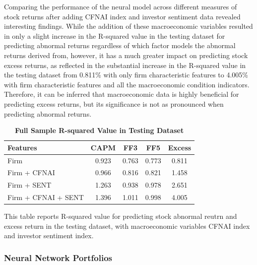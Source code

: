 Comparing the performance of the neural model across different measures of stock returns after adding CFNAI index and investor sentiment data revealed interesting findings. While the addition of these macroeconomic variables resulted in only a slight increase in the R-squared value in the testing dataset for predicting abnormal returns regardless of which factor models the abnormal returns derived from, however, it has a much greater impact on predicting stock excess returns, as reflected in the substantial increase in the R-squared value in the testing dataset from 0.811\% with only firm characteristic features to 4.005\% with firm characteristic features and all the macroeconomic condition indicators. Therefore, it can be inferred that macroeconomic data is highly beneficial for predicting excess returns, but its significance is not as pronounced when predicting abnormal returns. 

\begin{table}[!ht]
  \centering
  \caption{\textbf{Full Sample R-squared Value in Testing Dataset}}
  \label{table: full sample r2}
  \begin{tabular}{lcccc}
  \hline
  Features & CAPM & FF3 & FF5 & Excess \\ \hline
  Firm & 0.923 & 0.763 & 0.773 & 0.811 \\ 
  Firm + CFNAI & 0.966 & 0.816 & 0.821 & 1.458 \\ 
  Firm + SENT & 1.263 & 0.938 & 0.978 & 2.651 \\ 
  Firm + CFNAI + SENT & 1.396 & 1.011 & 0.998 & 4.005 \\ \hline
  \end{tabular}
  \begin{tablenotes}
    \footnotesize
    \item This table reports R-squared value for predicting stock abnormal reutrn and excess return in the testing dataset, with macroeconomic variables CFNAI index and investor sentiment index.
  \end{tablenotes}
\end{table}

\subsubsection{Neural Network Portfolios}

